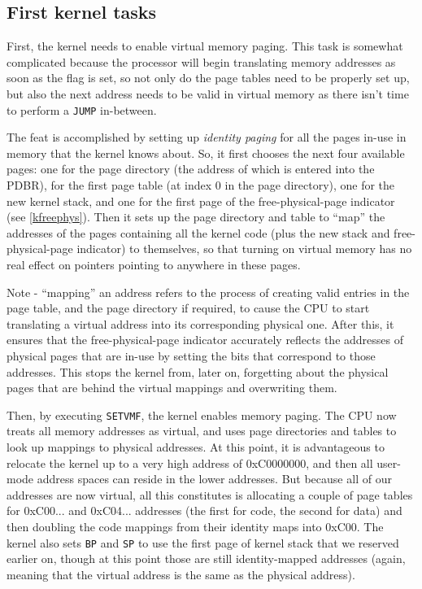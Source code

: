 \documentclass[12pt,a4paper]{report}
\begin{document}
\subsection*{First kernel tasks}

First, the kernel needs to enable virtual memory paging. This task is somewhat complicated because the processor will begin translating memory addresses as soon as the flag is set, so not only do the page tables need to be properly set up, but also the next address needs to be valid in virtual memory as there isn't time to perform a \texttt{JUMP} in-between.

The feat is accomplished by setting up \emph{identity paging} for all the pages in-use in memory that the kernel knows about. So, it first chooses the next four available pages: one for the page directory (the address of which is entered into the PDBR), for the first page table (at index 0 in the page directory), one for the new kernel stack, and one for the first page of the free-physical-page indicator (see \autoref{kfreephys}). Then it sets up the page directory and table to ``map'' the addresses of the pages containing all the kernel code (plus the new stack and free-physical-page indicator) to themselves, so that turning on virtual memory has no real effect on pointers pointing to anywhere in these pages.

Note - ``mapping'' an address refers to the process of creating valid entries in the page table, and the page directory if required, to cause the CPU to start translating a virtual address into its corresponding physical one. After this, it ensures that the free-physical-page indicator accurately reflects the addresses of physical pages that are in-use by setting the bits that correspond to those addresses. This stops the kernel from, later on, forgetting about the physical pages that are behind the virtual mappings and overwriting them.

Then, by executing \texttt{SETVMF}, the kernel enables memory paging. The CPU now treats all memory addresses as virtual, and uses page directories and tables to look up mappings to physical addresses. At this point, it is advantageous to relocate the kernel up to a very high address of 0xC0000000, and then all user-mode address spaces can reside in the lower addresses. But because all of our addresses are now virtual, all this constitutes is allocating a couple of page tables for 0xC00... and 0xC04... addresses (the first for code, the second for data) and then doubling the code mappings from their identity maps into 0xC00. The kernel also sets \texttt{BP} and \texttt{SP} to use the first page of kernel stack that we reserved earlier on, though at this point those are still identity-mapped addresses (again, meaning that the virtual address is the same as the physical address).
\end{document}
